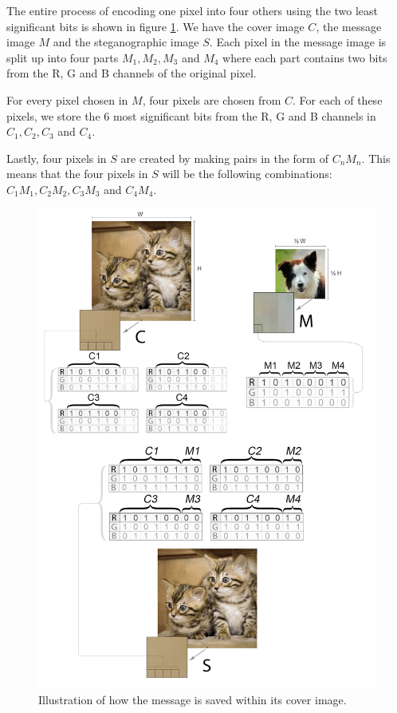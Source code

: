 The entire process of encoding one pixel into four others using the two least significant bits is shown in figure \ref{fig:hundigrafik}.
We have the cover image $C$, the message image $M$ and the steganographic image $S$.
Each pixel in the message image is split up into four parts $M_1, M_2, M_3$ and $M_4$ where each part contains two bits from the R, G and B channels of the original pixel.

For every pixel chosen in $M$, four pixels are chosen from $C$.
For each of these pixels, we store the 6 most significant bits from the R, G and B channels in $C_1, C_2, C_3$ and $C_4$.

Lastly, four pixels in $S$ are created by making pairs in the form of $C_nM_n$.
This means that the four pixels in $S$ will be the following combinations: $C_1M_1,C_2M_2,C_3M_3$ and $C_4M_4$.

\begin{figure}
	\centering
	\includegraphics[width=1\textwidth]{figures/hundikatgrafik.png}
	\caption{Illustration of how the message is saved within its cover image.}
	\label{fig:hundigrafik}
\end{figure}

